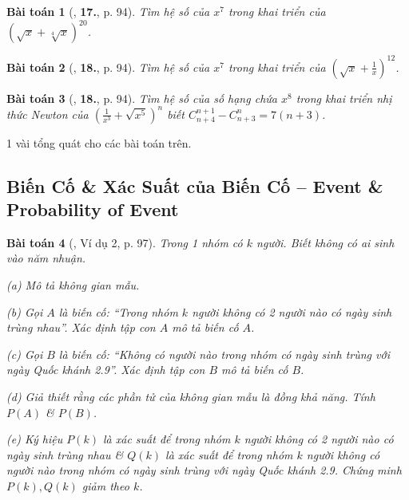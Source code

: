 \documentclass{article}
\numberwithin{equation}{section}
\newtheorem{baitoan}{Bài toán}[section]
\begin{document}
\begin{baitoan}[\cite{TL_chuyen_Toan_Dai_So_Giai_Tich_11}, \textbf{17.}, p. 94]
	Tìm hệ số của $x^7$ trong khai triển của $\left(\sqrt{x} + \sqrt[4]{x}\right)^{20}$.
\end{baitoan}

\begin{baitoan}[\cite{TL_chuyen_Toan_Dai_So_Giai_Tich_11}, \textbf{18.}, p. 94]
	Tìm hệ số của $x^7$ trong khai triển của $\left(\sqrt{x} + \frac{1}{x}\right)^{12}$.
\end{baitoan}

\begin{baitoan}[\cite{TL_chuyen_Toan_Dai_So_Giai_Tich_11}, \textbf{18.}, p. 94]
	Tìm hệ số của số hạng chứa $x^8$ trong khai triển nhị thức Newton của $\left(\frac{1}{x^3} + \sqrt{x^5}\right)^n$ biết $C_{n+4}^{n+1} - C_{n+3}^n = 7(n + 3)$.
\end{baitoan}
1 vài tổng quát cho các bài toán trên.


\subsection{Biến Cố \& Xác Suất của Biến Cố -- Event \& Probability of Event}

\begin{baitoan}[\cite{TL_chuyen_Toan_Dai_So_Giai_Tich_11}, Ví dụ 2, p. 97]
	Trong 1 nhóm có $k$ người. Biết không có ai sinh vào năm nhuận.
	\begin{enumerate*}
		\item[(a)] Mô tả không gian mẫu.
		\item[(b)] Gọi $A$ là biến cố: ``Trong nhóm $k$ người không có 2 người nào có ngày sinh trùng nhau''. Xác định tập con $A$ mô tả biến cố $A$.
		\item[(c)] Gọi $B$ là biến cố: ``Không có người nào trong nhóm có ngày sinh trùng với ngày Quốc khánh 2.9''. Xác định tập con $B$ mô tả biến cố $B$.
		\item[(d)] Giả thiết rằng các phần tử của không gian mẫu là đồng khả năng. Tính $P(A)$ \& $P(B)$.
		\item[(e)] Ký hiệu $P(k)$ là xác suất để trong nhóm $k$ người không có 2 người nào có ngày sinh trùng nhau \& $Q(k)$ là xác suất để trong nhóm $k$ người không có người nào trong nhóm có ngày sinh trùng với ngày Quốc khánh 2.9. Chứng minh $P(k),Q(k)$ giảm theo $k$.
	\end{enumerate*}
\end{baitoan}
\end{document}
